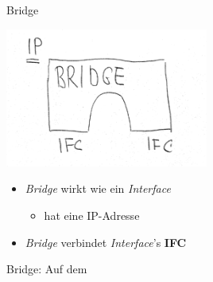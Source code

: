\begin{frame}{Bridge}
 \begin{center}
 \includegraphics[width=0.5\textwidth]{bridge-picture.pdf}
 \end{center}
 \begin{itemize}
  \item {\em Bridge} wirkt wie ein {\em Interface} 
  \begin{itemize}
   \item hat eine IP-Adresse 
  \end{itemize}
  \item {\em Bridge} verbindet {\em Interface}'s {\bf IFC}
 \end{itemize}
\end{frame}

\begin{frame}{Bridge: }{Auf dem \host}

\end{frame}
